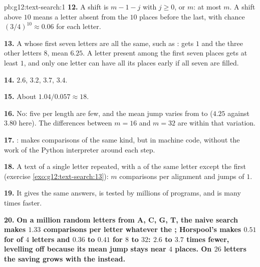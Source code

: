 \begin{solution}{pb:g12:text-search:1}
\textbf{12.} A shift is $m - 1 - j$ with $j \ge 0$, or $m$: at most $m$. A shift above $10$ means a letter absent from
the $10$ places before the last, with chance $(3/4)^{10} \approx 0.06$ for each letter.

\textbf{13.} A  whose first seven letters are all the same, such as :  gets $1$ and the
three other letters $8$, mean $6.25$. A letter present among the first seven places gets at least $1$, and only one
letter can have all its places early if all seven are filled.

\textbf{14.} $2.6$, $3.2$, $3.7$, $3.4$.

\textbf{15.} About $1.04 / 0.057 \approx 18$.

\textbf{16.} No: five  per length are few, and the mean jump varies from  to  ($4.25$ against
$3.80$ here). The differences between $m = 16$ and $m = 32$ are within that variation.

\textbf{17.} :  makes comparisons of the same kind, but in machine code, without
the work of the Python interpreter around each step.

\textbf{18.} A text of a single letter repeated, with a  of the same letter except the first (exercise
\ref{exo:g12:text-search:13}): $m$ comparisons per alignment and jumps of $1$.

\textbf{19.} It gives the same answers, is tested by millions of programs, and is many times faster.

\textbf{20.} \textbf{On a million random letters from A, C, G, T, the naive search makes $1.33$ comparisons per letter
whatever the ; Horspool's makes $0.51$ for  of $4$ letters and $0.36$ to $0.41$ for $8$ to $32$: $2.6$
to $3.7$ times fewer, levelling off because its mean jump stays near $4$ places. On $26$ letters the saving grows with
the  instead.}
\end{solution}
